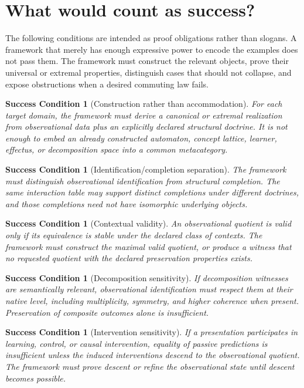 \documentclass[11pt]{article}
\newtheorem{condition}[theorem]{Success Condition}
\theoremstyle{definition}
\theoremstyle{remark}
\begin{document}
\section{What would count as success?}

The following conditions are intended as proof obligations rather than slogans. A framework that merely has enough expressive power to encode the examples does not pass them. The framework must construct the relevant objects, prove their universal or extremal properties, distinguish cases that should not collapse, and expose obstructions when a desired commuting law fails.

\begin{condition}[Construction rather than accommodation]
For each target domain, the framework must derive a canonical or extremal realization from observational data plus an explicitly declared structural doctrine. It is not enough to embed an already constructed automaton, concept lattice, learner, effectus, or decomposition space into a common metacategory.
\end{condition}

\begin{condition}[Identification/completion separation]
The framework must distinguish observational identification from structural completion. The same interaction table may support distinct completions under different doctrines, and those completions need not have isomorphic underlying objects.
\end{condition}

\begin{condition}[Contextual validity]
An observational quotient is valid only if its equivalence is stable under the declared class of contexts. The framework must construct the maximal valid quotient, or produce a witness that no requested quotient with the declared preservation properties exists.
\end{condition}

\begin{condition}[Decomposition sensitivity]
If decomposition witnesses are semantically relevant, observational identification must respect them at their native level, including multiplicity, symmetry, and higher coherence when present. Preservation of composite outcomes alone is insufficient.
\end{condition}

\begin{condition}[Intervention sensitivity]
If a presentation participates in learning, control, or causal intervention, equality of passive predictions is insufficient unless the induced interventions descend to the observational quotient. The framework must prove descent or refine the observational state until descent becomes possible.
\end{condition}
\end{document}
